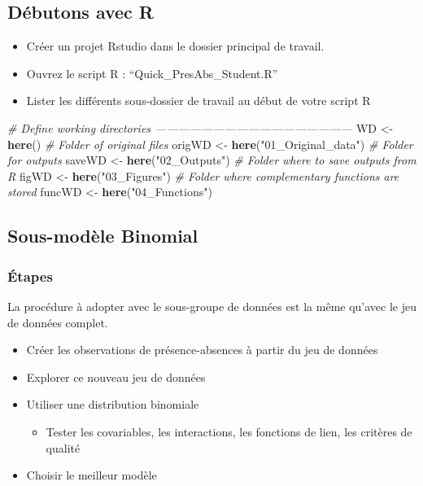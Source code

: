 \documentclass[french,a4paper]{article}
\newenvironment{Shaded}{\begin{snugshade}}{\end{snugshade}}
\newcommand{\CommentTok}[1]{\textcolor[rgb]{0.56,0.35,0.01}{\textit{#1}}}
\newcommand{\KeywordTok}[1]{\textcolor[rgb]{0.13,0.29,0.53}{\textbf{#1}}}
\newcommand{\NormalTok}[1]{#1}
\newcommand{\StringTok}[1]{\textcolor[rgb]{0.31,0.60,0.02}{#1}}
\providecommand{\tightlist}{%
  \setlength{\itemsep}{0pt}\setlength{\parskip}{0pt}}
\begin{document}
\hypertarget{debutons-avec-r}{%
\subsection{Débutons avec R}\label{debutons-avec-r}}

\begin{itemize}
\tightlist
\item
  Créer un projet Rstudio dans le dossier principal de travail.
\item
  Ouvrez le script R : ``Quick\_PresAbs\_Student.R''
\item
  Lister les différents sous-dossier de travail au début de votre script
  R
\end{itemize}

\begin{Shaded}
\begin{Highlighting}[]
\CommentTok{# Define working directories ---------------------------------------------------}
\NormalTok{WD <-}\StringTok{ }\KeywordTok{here}\NormalTok{()}
\CommentTok{# Folder of original files}
\NormalTok{origWD <-}\StringTok{ }\KeywordTok{here}\NormalTok{(}\StringTok{"01_Original_data"}\NormalTok{)}
\CommentTok{# Folder for outputs}
\NormalTok{saveWD <-}\StringTok{ }\KeywordTok{here}\NormalTok{(}\StringTok{"02_Outputs"}\NormalTok{)}
\CommentTok{# Folder where to save outputs from R}
\NormalTok{figWD <-}\StringTok{ }\KeywordTok{here}\NormalTok{(}\StringTok{"03_Figures"}\NormalTok{)}
\CommentTok{# Folder where complementary functions are stored}
\NormalTok{funcWD <-}\StringTok{ }\KeywordTok{here}\NormalTok{(}\StringTok{"04_Functions"}\NormalTok{)}
\end{Highlighting}
\end{Shaded}

\hypertarget{sous-modele-binomial}{%
\subsection{Sous-modèle Binomial}\label{sous-modele-binomial}}

\hypertarget{etapes}{%
\subsubsection{Étapes}\label{etapes}}

La procédure à adopter avec le sous-groupe de données est la même
qu'avec le jeu de données complet.

\begin{itemize}
\tightlist
\item
  Créer les observations de présence-absences à partir du jeu de données
\item
  Explorer ce nouveau jeu de données
\item
  Utiliser une distribution binomiale

  \begin{itemize}
  \tightlist
  \item
    Tester les covariables, les interactions, les fonctions de lien, les
    critères de qualité
  \end{itemize}
\item
  Choisir le meilleur modèle
\end{itemize}
\end{document}
